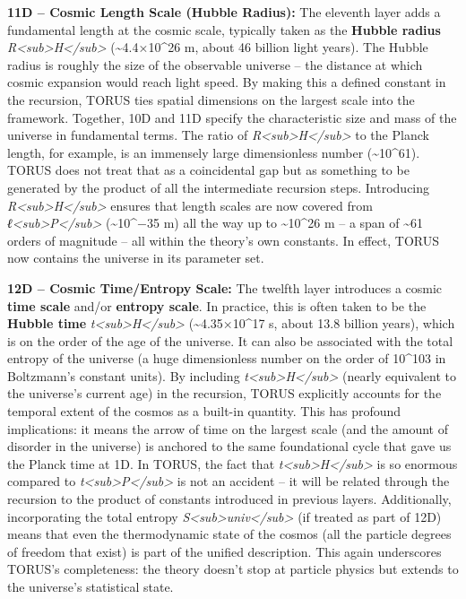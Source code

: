 \documentclass[
]{article}
\begin{document}
\textbf{11D -- Cosmic Length Scale (Hubble Radius):} The eleventh layer
adds a fundamental length at the cosmic scale, typically taken as the
\textbf{Hubble radius}
\emph{R\textless sub\textgreater H\textless/sub\textgreater{}}
(\textasciitilde4.4×10\^{}26 m, about 46 billion light years). The
Hubble radius is roughly the size of the observable universe -- the
distance at which cosmic expansion would reach light speed. By making
this a defined constant in the recursion, TORUS ties spatial dimensions
on the largest scale into the framework. Together, 10D and 11D specify
the characteristic size and mass of the universe in fundamental terms.
The ratio of
\emph{R\textless sub\textgreater H\textless/sub\textgreater{}} to the
Planck length, for example, is an immensely large dimensionless number
(\textasciitilde10\^{}61). TORUS does not treat that as a coincidental
gap but as something to be generated by the product of all the
intermediate recursion steps. Introducing
\emph{R\textless sub\textgreater H\textless/sub\textgreater{}} ensures
that length scales are now covered from
\emph{ℓ\textless sub\textgreater P\textless/sub\textgreater{}}
(\textasciitilde10\^{}−35 m) all the way up to \textasciitilde10\^{}26 m
-- a span of \textasciitilde61 orders of magnitude -- all within the
theory's own constants. In effect, TORUS now contains the universe in
its parameter set.

\textbf{12D -- Cosmic Time/Entropy Scale:} The twelfth layer introduces
a cosmic \textbf{time scale} and/or \textbf{entropy scale}. In practice,
this is often taken to be the \textbf{Hubble time}
\emph{t\textless sub\textgreater H\textless/sub\textgreater{}}
(\textasciitilde4.35×10\^{}17 s, about 13.8 billion years), which is on
the order of the age of the universe. It can also be associated with the
total entropy of the universe (a huge dimensionless number on the order
of 10\^{}103 in Boltzmann's constant units). By including
\emph{t\textless sub\textgreater H\textless/sub\textgreater{}} (nearly
equivalent to the universe's current age) in the recursion, TORUS
explicitly accounts for the temporal extent of the cosmos as a built-in
quantity. This has profound implications: it means the arrow of time on
the largest scale (and the amount of disorder in the universe) is
anchored to the same foundational cycle that gave us the Planck time at
1D. In TORUS, the fact that
\emph{t\textless sub\textgreater H\textless/sub\textgreater{}} is so
enormous compared to
\emph{t\textless sub\textgreater P\textless/sub\textgreater{}} is not an
accident -- it will be related through the recursion to the product of
constants introduced in previous layers. Additionally, incorporating the
total entropy
\emph{S\textless sub\textgreater univ\textless/sub\textgreater{}} (if
treated as part of 12D) means that even the thermodynamic state of the
cosmos (all the particle degrees of freedom that exist) is part of the
unified description. This again underscores TORUS's completeness: the
theory doesn't stop at particle physics but extends to the universe's
statistical state.
\end{document}
